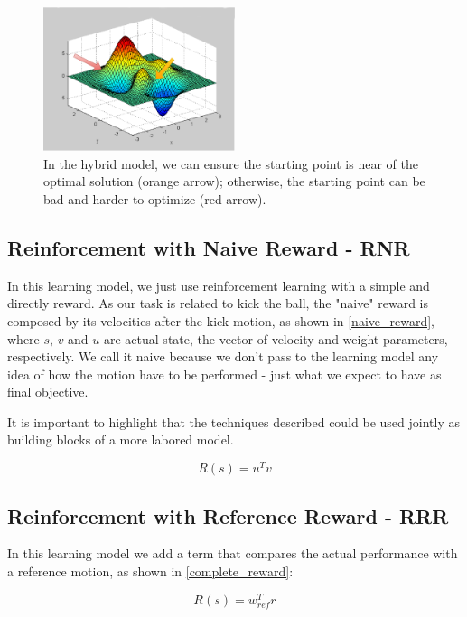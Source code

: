 \begin{figure}[!htbp]
	\centering
	\includegraphics[width=0.5\textwidth]{Cap5/optimization_final.eps}
	\caption{In the hybrid model, we can ensure the starting point is near of the optimal solution (orange arrow); otherwise, the starting point can be bad and harder to optimize (red arrow).}
	\label{optimization_intuition}
\end{figure}

\subsection{Reinforcement with Naive Reward - RNR }
In this learning model, we just use reinforcement learning with a simple and directly reward. As our task is related to kick the ball, the "naive" reward is composed by its velocities after the kick motion, as shown in \ref{naive_reward}, where $s$, $v$ and $u$ are actual state, the vector of velocity and weight parameters, respectively. We call it naive because we don't pass to the learning model any idea of how the motion have to be performed - just what we expect to have as final objective. 

It is important to highlight that the techniques described could be used jointly as building blocks of a more labored model.

\begin{equation}
R(s) = u^{T}v
\label{naive_reward}
\end{equation}

\subsection{Reinforcement with Reference Reward - RRR }
In this learning model we add a term that compares the actual performance with a reference motion, as shown in \ref{complete_reward}:

\begin{equation}
R(s) = w_{ref}^{T}r
\label{complete_reward}
\end{equation}

